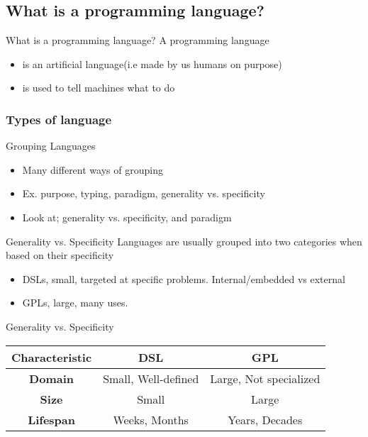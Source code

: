 \subsection{What is a programming language?}
\begin{frame}{What is a programming language?}
    A programming language
    \begin{itemize}[<+->]
        \item is an artificial language(i.e made by us humans on purpose)
        \item is used to tell machines what to do
    \end{itemize}
\end{frame}

\subsubsection{Types of language}
\begin{frame}{Grouping Languages}
    \begin{itemize}[<+->]
        \item Many different ways of grouping
        \item Ex. purpose, typing, paradigm, generality vs. specificity
        \item Look at; generality vs. specificity, and paradigm
    \end{itemize}
\end{frame}

\begin{frame}{Generality vs. Specificity}
    Languages are usually grouped into two categories when based on their specificity
    \begin{itemize}[<+->]
        \item DSLs, small,  targeted at specific problems. Internal/embedded vs external 
        \item GPLs, large, many uses.
    \end{itemize}
\end{frame}

\begin{frame}{Generality vs. Specificity}
    \begin{tabular}{|c|c|c|}%
        \hline
        \textbf{Characteristic} &\textbf{DSL} &\textbf{GPL}\\
        \hline
        \textbf{Domain} &Small, Well-defined & Large, Not specialized\\
        \hline
        \textbf{Size} &Small &Large\\
        \hline
        \textbf{Lifespan} &Weeks, Months &Years, Decades \\
        \hline
    \end{tabular}%
\end{frame}

